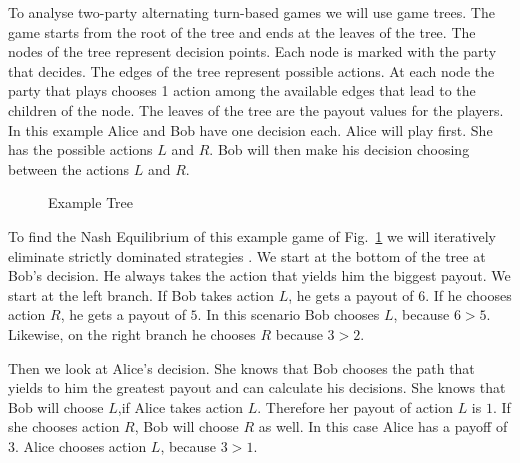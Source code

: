 \documentclass{cacthesis}
\newcommand{\authnote}[3]{{ \footnotesize \textbf{#1[#2: #3]~}}}
\newcommand{\niknote}[1]{\authnote{\color{red}}{Nikos}{#1}}
\begin{document}
To analyse two-party alternating turn-based games we will use game trees. The game starts from the root of the tree and ends at the leaves of the tree. The nodes of the tree represent decision points. Each node is marked with the party that decides. The edges of the tree represent possible actions. At each node the party that plays chooses 1 action among the available edges that lead to the children of the node. The leaves of the tree are the payout values for the players. In this example Alice and Bob have one decision each. Alice will play first. She has the possible actions $L$ and $R$. Bob will then make his decision choosing between the actions $L$ and $R$. \newline

\begin{figure}[htb!]
    \centering
    \caption{Example Tree}
    \label{fig:example-tree}
\end{figure}

To find the Nash Equilibrium of this example game of Fig.~\ref{fig:example-tree} we will iteratively eliminate strictly dominated strategies \cite{rasmusen_games_nodate}.
We start at the bottom of the tree at Bob's decision. He always takes the action that yields him the biggest payout.  We start at the left branch. If Bob takes action $L$, he gets a payout of $6$. If he chooses action $R$, he gets a payout of $5$. In this scenario Bob chooses $L$, because $6>5$.
Likewise, on the right branch he chooses $R$ because $3>2$.\newline

Then we look at Alice's decision. She knows that Bob chooses the path that yields to him the greatest payout and can calculate his decisions. She knows that Bob will choose $L$,if Alice takes action $L$. Therefore her payout of action $L$ is $1$. If she chooses action $R$, Bob will choose $R$ as well. In this case Alice has a payoff of $3$. Alice chooses action $L$, because $3>1$.\newline
\end{document}
